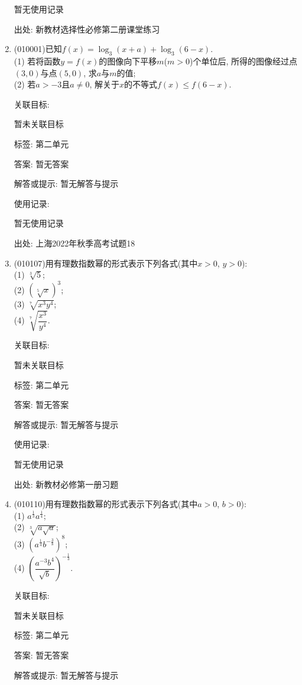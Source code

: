 \documentclass[10pt,a4paper]{article}
\begin{document}
\begin{enumerate}[1.]
暂无使用记录


出处: 新教材选择性必修第二册课堂练习
\item { (010001)}已知$f(x)=\log_3(x+a)+\log_3(6-x)$.\\
(1) 若将函数$y=f(x)$的图像向下平移$m$($m>0$)个单位后, 所得的图像经过点$(3,0)$与点$(5,0)$, 求$a$与$m$的值;\\
(2) 若$a>-3$且$a\ne 0$, 解关于$x$的不等式$f(x)\le f(6-x)$.


关联目标:

暂未关联目标



标签: 第二单元

答案: 暂无答案

解答或提示: 暂无解答与提示

使用记录:

暂无使用记录


出处: 上海2022年秋季高考试题18
\item { (010107)}用有理数指数幂的形式表示下列各式(其中$x>0$, $y>0$):\\
(1) $\sqrt[3]{5}$;\\
(2) $(\sqrt[5]{x})^3$;\\
(3) $\sqrt[7]{x^3y^4}$;\\
(4) $\sqrt[7]{\dfrac{x^3}{y^4}}$.


关联目标:

暂未关联目标



标签: 第二单元

答案: 暂无答案

解答或提示: 暂无解答与提示

使用记录:

暂无使用记录


出处: 新教材必修第一册习题
\item { (010110)}用有理数指数幂的形式表示下列各式(其中$a>0$, $b>0$):\\
(1) $a^\frac 13a^\frac 14$;\\
(2) $\sqrt[3]{a\sqrt a}$;\\
(3) $(a^\frac 14b^{-\frac 38})^8$;\\
(4) $(\dfrac {a^{-3}b^4}{\sqrt b})^{-\frac 13}$.


关联目标:

暂未关联目标



标签: 第二单元

答案: 暂无答案

解答或提示: 暂无解答与提示


\end{enumerate}
\end{document}
